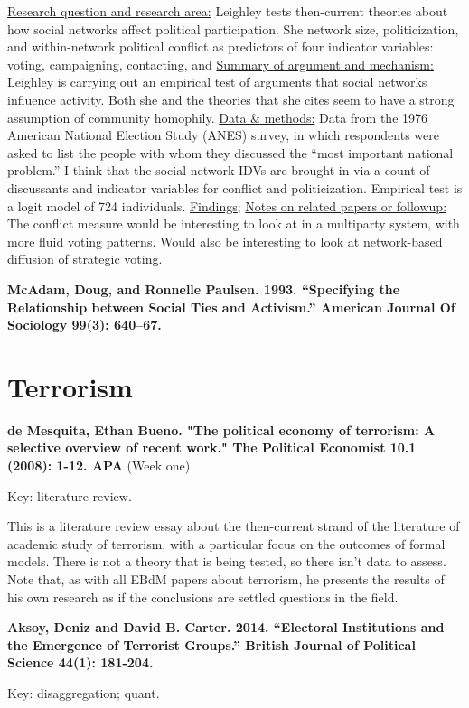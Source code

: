 \documentclass{article}[12pt]
\begin{document}
\underline{Research question and research area:} Leighley tests then-current theories about how social networks affect political participation. She network size, politicization, and within-network political conflict as predictors of four indicator variables: voting, campaigning, contacting, and 
\underline{Summary of argument and mechanism:} Leighley is carrying out an empirical test of arguments that social networks influence activity. Both she and the theories that she cites seem to have a strong assumption of community homophily.
\underline{Data \& methods:} Data from the 1976 American National Election Study (ANES) survey, in which respondents were asked to list the people with whom they discussed the ``most important national problem.''  I think that the social network IDVs are brought in via a count of discussants and indicator variables for conflict and politicization. Empirical test is a logit model of 724 individuals.
\underline{Findings};
\underline{Notes on related papers or followup:} The conflict measure would be interesting to look at in a multiparty system, with more fluid voting patterns. Would also be interesting to look at network-based diffusion of strategic voting. 

\textbf{McAdam, Doug, and Ronnelle Paulsen. 1993. “Specifying the Relationship between Social Ties and Activism.” American Journal Of Sociology 99(3): 640–67.}


\section{Terrorism}

\textbf{de Mesquita, Ethan Bueno. "The political economy of terrorism: A selective overview of recent work." The Political Economist 10.1 (2008): 1-12.
APA} (Week one)

Key: literature review.
 
This is a literature review essay about the then-current strand of the literature of academic study of terrorism, with a particular focus on the outcomes of formal models.  There is not a theory that is being tested, so there isn't data to assess. Note that, as with all EBdM papers about terrorism, he presents the results of his own research as if the conclusions are settled questions in the field.

\textbf{Aksoy, Deniz and David B. Carter. 2014. “Electoral Institutions and the Emergence of Terrorist Groups.” British Journal of Political Science 44(1): 181-204.}

Key: disaggregation; quant.
\end{document}
